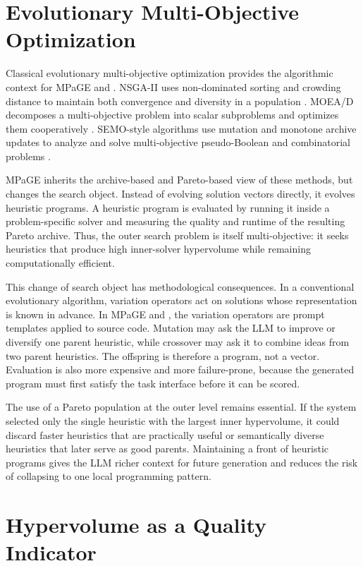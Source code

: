 \section{Evolutionary Multi-Objective Optimization}

Classical evolutionary multi-objective optimization provides the algorithmic context for MPaGE and \bmab{}. NSGA-II uses non-dominated sorting and crowding distance to maintain both convergence and diversity in a population \cite{deb2002nsga2}. MOEA/D decomposes a multi-objective problem into scalar subproblems and optimizes them cooperatively \cite{zhang2007moead}. SEMO-style algorithms use mutation and monotone archive updates to analyze and solve multi-objective pseudo-Boolean and combinatorial problems \cite{laumanns2004semo}.

MPaGE inherits the archive-based and Pareto-based view of these methods, but changes the search object. Instead of evolving solution vectors directly, it evolves heuristic programs. A heuristic program is evaluated by running it inside a problem-specific solver and measuring the quality and runtime of the resulting Pareto archive. Thus, the outer search problem is itself multi-objective: it seeks heuristics that produce high inner-solver hypervolume while remaining computationally efficient.

This change of search object has methodological consequences. In a conventional evolutionary algorithm, variation operators act on solutions whose representation is known in advance. In MPaGE and \bmab{}, the variation operators are prompt templates applied to source code. Mutation may ask the LLM to improve or diversify one parent heuristic, while crossover may ask it to combine ideas from two parent heuristics. The offspring is therefore a program, not a vector. Evaluation is also more expensive and more failure-prone, because the generated program must first satisfy the task interface before it can be scored.

The use of a Pareto population at the outer level remains essential. If the system selected only the single heuristic with the largest inner hypervolume, it could discard faster heuristics that are practically useful or semantically diverse heuristics that later serve as good parents. Maintaining a front of heuristic programs gives the LLM richer context for future generation and reduces the risk of collapsing to one local programming pattern.

\section{Hypervolume as a Quality Indicator}

